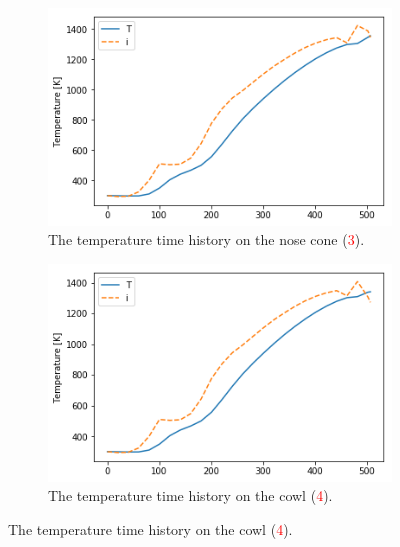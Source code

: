 \begin{figure}[ht]
\begin{subfigure}{.5\textwidth}
	\end{subfigure}
	\begin{subfigure}{.5\textwidth}
		\centering
		\includegraphics[width=0.99\linewidth]{figures/A1_uncertainty-analysis/TPos1}
		\caption{The temperature time history on the nose cone (\textcolor{red}{3}).}

	\end{subfigure}
		\begin{subfigure}{.5\textwidth}
			\centering
			\includegraphics[width=0.99\linewidth]{figures/A1_uncertainty-analysis/TPos2}
			\caption{The temperature time history on the cowl (\textcolor{red}{4}).}
			

\end{subfigure}
\end{figure}
